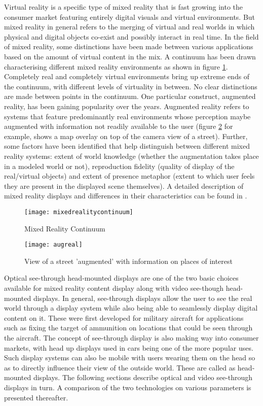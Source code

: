 Virtual reality is a specific type of mixed reality that is fast growing into the consumer market featuring entirely digital visuals and virtual environments. But mixed reality in general refers to the merging of virtual and real worlds in which physical and digital objects co-exist and possibly interact in real time.  In the field of mixed reality, some distinctions have been made between various applications based on the amount of virtual content in the mix. A continuum has been drawn characterising different mixed reality environments as shown in figure \ref{fig:mixedrealitycontinuum}. Completely real and completely virtual environments bring up extreme ends of the continuum, with different levels of virtuality in between. No clear distinctions are made between points in the continuum. One particular construct, augmented reality, has been gaining popularity over the years. Augmented reality refers to systems that feature predominantly real environments whose perception maybe augmented with information not readily available to the user (figure \ref{fig:augreal} for example, shows a map overlay on top of the camera view of a street). Further, some factors have been identified that help distinguish between different mixed reality systems: extent of world knowledge (whether the augmentation takes place in a modeled world or not), reproduction fidelity (quality of display of the real/virtual objects) and extent of presence metaphor (extent to which user feels they are present in the displayed scene themselves). A detailed description of mixed reality displays and differences in their characteristics can be found in \cite{milgram1995augmented}. 

 
\begin{figure}
	\centering
	\texttt{[image: mixedrealitycontinuum]}
	\caption{Mixed Reality Continuum \cite{milgram1995augmented}}
	\label{fig:mixedrealitycontinuum}
\end{figure}

\begin{figure}
	\centering
	\texttt{[image: augreal]}
	\caption{View of a street 'augmented' with information on places of interest}
	\label{fig:augreal}
\end{figure}


Optical see-through head-mounted displays are one of the two basic choices available for mixed reality content display along with video see-though head-mounted displays. In general, see-through displays allow the user to see the real world through a display system while also being able to seamlessly display digital content on it. These were first developed for military aircraft for applications such as fixing the target of ammunition on locations that could be seen through the aircraft. The concept of see-through display is also making way into consumer markets, with head up displays used in cars being one of the more popular uses. Such display systems can also be mobile with users wearing them on the head so as to directly influence their view of the outside world. These are called as head-mounted displays. The following sections describe optical and video see-through displays in turn. A comparison of the two technologies on various parameters is presented thereafter.


